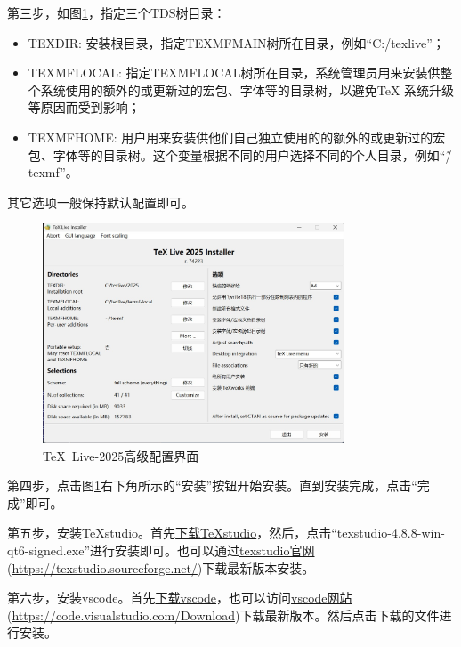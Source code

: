 \begin{enumerate}
        第三步，如图\ref{fig:texlive-tl-gui-adv}，指定三个TDS树目录：
        \begin{itemize}
            \item TEXDIR: 安装根目录，指定TEXMFMAIN树所在目录，例如“C:/texlive”；
            \item TEXMFLOCAL: 指定TEXMFLOCAL树所在目录，系统管理员用来安装供整个系统使用的额外的或更新过的宏包、字体等的目录树，以避免TeX 系统升级等原因而受到影响；
            \item TEXMFHOME: 用户用来安装供他们自己独立使用的的额外的或更新过的宏包、字体等的目录树。这个变量根据不同的用户选择不同的个人目录，例如“\~/texmf”。
        \end{itemize}
        其它选项一般保持默认配置即可。
        \begin{figure}[!hptb]
        \centering
        \includegraphics[width=0.8\textwidth]{doc/figures/texlive-tl-gui-adv.jpg}
        \caption{\TeX~Live-2025高级配置界面}
        \label{fig:texlive-tl-gui-adv}
        \end{figure}
        
        第四步，点击图\ref{fig:texlive-tl-gui-adv}右下角所示的“安装”按钮开始安装。直到安装完成，点击“完成”即可。

        第五步，安装TeXstudio。首先\href{https://mirrors.tuna.tsinghua.edu.cn/github-release/texstudio-org/texstudio/LatestRelease/texstudio-4.8.8-win-qt6-signed.exe}{下载TeXstudio}，然后，点击“texstudio-4.8.8-win-qt6-signed.exe”进行安装即可。也可以通过\href{https://texstudio.sourceforge.net/}{texstudio官网}(\url{https://texstudio.sourceforge.net/})下载最新版本安装。

        第六步，安装vscode。首先\href{https://vscode.download.prss.microsoft.com/dbazure/download/stable/488a1f239235055e34e673291fb8d8c810886f81/VSCodeUserSetup-x64-1.102.3.exe}{下载vscode}，也可以访问\href{https://code.visualstudio.com/Download}{vscode网站}(\url{https://code.visualstudio.com/Download})下载最新版本。然后点击下载的文件进行安装。


\end{enumerate}

